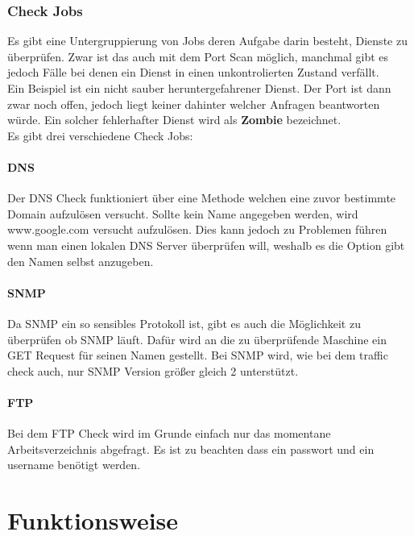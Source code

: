 \documentclass[12pt,a4paper]{report}
\begin{document}
\subsubsection{Check Jobs}
Es gibt eine Untergruppierung von Jobs deren Aufgabe darin besteht, Dienste zu überprüfen. Zwar ist das auch mit dem Port Scan möglich, manchmal gibt es jedoch Fälle bei denen ein Dienst in einen unkontrolierten Zustand verfällt.\\
Ein Beispiel ist ein nicht sauber heruntergefahrener Dienst. Der Port ist dann zwar noch offen, jedoch liegt keiner dahinter welcher Anfragen beantworten würde. Ein solcher fehlerhafter Dienst wird als \textbf{Zombie} bezeichnet.\\

Es gibt drei verschiedene Check Jobs:\\
\paragraph{DNS}
Der DNS Check funktioniert über eine Methode welchen eine zuvor bestimmte Domain aufzulösen versucht. Sollte kein Name angegeben werden, wird www.google.com versucht aufzulösen. Dies kann jedoch zu Problemen führen wenn man einen lokalen DNS Server überprüfen will, weshalb es die Option gibt den Namen selbst anzugeben.

\paragraph{SNMP}
Da SNMP ein so sensibles Protokoll ist, gibt es auch die Möglichkeit zu überprüfen ob SNMP läuft. Dafür wird an die zu überprüfende Maschine ein GET Request für seinen Namen gestellt. Bei SNMP wird, wie bei dem traffic check auch, nur SNMP Version größer gleich 2 unterstützt.

\paragraph{FTP}
Bei dem FTP Check wird im Grunde einfach nur das momentane Arbeitsverzeichnis abgefragt. Es ist zu beachten dass ein passwort und ein username benötigt werden. 

\section{Funktionsweise}
\end{document}
